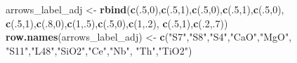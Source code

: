 \documentclass[12pt,]{book}
\newenvironment{Shaded}{\begin{snugshade}}{\end{snugshade}}
\newcommand{\DecValTok}[1]{\textcolor[rgb]{0.00,0.00,0.81}{#1}}
\newcommand{\KeywordTok}[1]{\textcolor[rgb]{0.13,0.29,0.53}{\textbf{#1}}}
\newcommand{\NormalTok}[1]{#1}
\newcommand{\StringTok}[1]{\textcolor[rgb]{0.31,0.60,0.02}{#1}}
\begin{document}
\begin{Shaded}
\begin{Highlighting}[]
\NormalTok{arrows_label_adj <-}\StringTok{ }\KeywordTok{rbind}\NormalTok{(}\KeywordTok{c}\NormalTok{(.}\DecValTok{5}\NormalTok{,}\DecValTok{0}\NormalTok{),}\KeywordTok{c}\NormalTok{(.}\DecValTok{5}\NormalTok{,}\DecValTok{1}\NormalTok{),}\KeywordTok{c}\NormalTok{(.}\DecValTok{5}\NormalTok{,}\DecValTok{0}\NormalTok{),}\KeywordTok{c}\NormalTok{(.}\DecValTok{5}\NormalTok{,}\DecValTok{1}\NormalTok{),}\KeywordTok{c}\NormalTok{(.}\DecValTok{5}\NormalTok{,}\DecValTok{0}\NormalTok{),}
                          \KeywordTok{c}\NormalTok{(.}\DecValTok{5}\NormalTok{,}\DecValTok{1}\NormalTok{),}\KeywordTok{c}\NormalTok{(.}\DecValTok{8}\NormalTok{,}\DecValTok{0}\NormalTok{),}\KeywordTok{c}\NormalTok{(}\DecValTok{1}\NormalTok{,.}\DecValTok{5}\NormalTok{),}\KeywordTok{c}\NormalTok{(.}\DecValTok{5}\NormalTok{,}\DecValTok{0}\NormalTok{),}\KeywordTok{c}\NormalTok{(}\DecValTok{1}\NormalTok{,.}\DecValTok{2}\NormalTok{),}
                          \KeywordTok{c}\NormalTok{(.}\DecValTok{5}\NormalTok{,}\DecValTok{1}\NormalTok{),}\KeywordTok{c}\NormalTok{(.}\DecValTok{2}\NormalTok{,.}\DecValTok{7}\NormalTok{))}
\KeywordTok{row.names}\NormalTok{(arrows_label_adj) <-}\StringTok{ }\KeywordTok{c}\NormalTok{(}\StringTok{"S7"}\NormalTok{,}\StringTok{"S8"}\NormalTok{,}\StringTok{"S4"}\NormalTok{,}\StringTok{"CaO"}\NormalTok{,}\StringTok{"MgO"}\NormalTok{,}
                                 \StringTok{"S11"}\NormalTok{,}\StringTok{"L48"}\NormalTok{,}\StringTok{"SiO2"}\NormalTok{,}\StringTok{"Ce"}\NormalTok{,}\StringTok{"Nb"}\NormalTok{,}
                                 \StringTok{"Th"}\NormalTok{,}\StringTok{"TiO2"}\NormalTok{)}


\end{Highlighting}
\end{Shaded}
\end{document}
